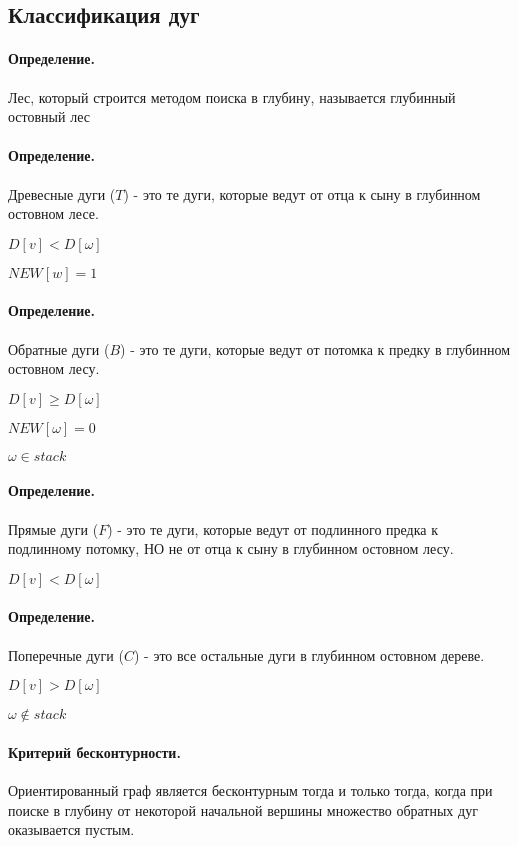 \documentclass{report}
\begin{document}
\subsection{Классификация дуг}
\paragraph*{Определение.}
Лес, который строится методом поиска в глубину, называется глубинный остовный лес

\paragraph*{Определение.}
Древесные дуги ($T$) - это те дуги, которые ведут от отца к сыну в глубинном остовном лесе.

$D[v] < D[\omega]$

$NEW[w] = 1$

 \paragraph*{Определение.}
Обратные дуги ($B$) - это те дуги, которые ведут от потомка к предку в глубинном остовном лесу.

$D[v] \ge  D[\omega]$

$NEW[\omega] = 0$

 $\omega \in stack$

\paragraph*{Определение.}
Прямые дуги ($F$) - это те дуги, которые ведут от подлинного предка к подлинному потомку, НО
не от отца к сыну в глубинном остовном лесу.

$D[v] < D[\omega]$

\paragraph*{Определение.}
Поперечные дуги ($C$) - это все остальные дуги в глубинном остовном дереве.

$D[v] > D[\omega]$

$\omega \notin stack $

\paragraph*{Критерий бесконтурности.}
Ориентированный граф является бесконтурным тогда и только тогда, когда при поиске в глубину
от некоторой начальной вершины множество обратных дуг оказывается пустым.

\newpage
\end{document}
